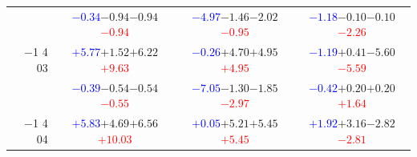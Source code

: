 \documentclass[compress]{beamer}
\begin{document}
\begin{frame}
\begin{tabular}{r | c | c | c}
          & \textcolor{blue}{$-0.34$}\hspace{0.1 cm}$-0.94$\hspace{0.1 cm}$-0.94$\hspace{0.1 cm}\textcolor{red}{$-0.94$} & \textcolor{blue}{$-4.97$}\hspace{0.1 cm}$-1.46$\hspace{0.1 cm}$-2.02$\hspace{0.1 cm}\textcolor{red}{$-0.95$} & \textcolor{blue}{$-1.18$}\hspace{0.1 cm}$-0.10$\hspace{0.1 cm}$-0.10$\hspace{0.1 cm}\textcolor{red}{$-2.26$} \\
$-$1 4 03 & \textcolor{blue}{$+5.77$}\hspace{0.1 cm}$+1.52$\hspace{0.1 cm}$+6.22$\hspace{0.1 cm}\textcolor{red}{$+9.63$} & \textcolor{blue}{$-0.26$}\hspace{0.1 cm}$+4.70$\hspace{0.1 cm}$+4.95$\hspace{0.1 cm}\textcolor{red}{$+4.95$} & \textcolor{blue}{$-1.19$}\hspace{0.1 cm}$+0.41$\hspace{0.1 cm}$-5.60$\hspace{0.1 cm}\textcolor{red}{$-5.59$} \\
          & \textcolor{blue}{$-0.39$}\hspace{0.1 cm}$-0.54$\hspace{0.1 cm}$-0.54$\hspace{0.1 cm}\textcolor{red}{$-0.55$} & \textcolor{blue}{$-7.05$}\hspace{0.1 cm}$-1.30$\hspace{0.1 cm}$-1.85$\hspace{0.1 cm}\textcolor{red}{$-2.97$} & \textcolor{blue}{$-0.42$}\hspace{0.1 cm}$+0.20$\hspace{0.1 cm}$+0.20$\hspace{0.1 cm}\textcolor{red}{$+1.64$} \\
$-$1 4 04 & \textcolor{blue}{$+5.83$}\hspace{0.1 cm}$+4.69$\hspace{0.1 cm}$+6.56$\hspace{0.1 cm}\textcolor{red}{$+10.03$} & \textcolor{blue}{$+0.05$}\hspace{0.1 cm}$+5.21$\hspace{0.1 cm}$+5.45$\hspace{0.1 cm}\textcolor{red}{$+5.45$} & \textcolor{blue}{$+1.92$}\hspace{0.1 cm}$+3.16$\hspace{0.1 cm}$-2.82$\hspace{0.1 cm}\textcolor{red}{$-2.81$} \\

\end{tabular}
\end{frame}
\end{document}

